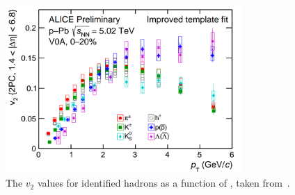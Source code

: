 \begin{figure}[ht]
    \centering
    \includegraphics[width=0.8\textwidth]{figures/analysis/v2_diagram.png}
    \caption{The $v_{2}$ values for identified hadrons as a function of \pt, taken from~\cite{ALICEv2_1}.}
    \label{fig:v2_plot}
\end{figure}

